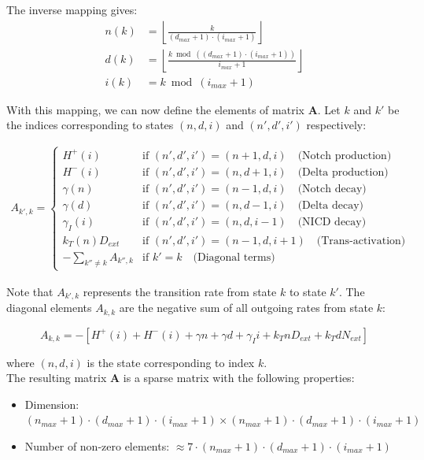 \documentclass{article}
\begin{document}
\begin{flushleft}
The inverse mapping gives:
\begin{align*}
n(k) &= \left\lfloor \frac{k}{(d_{max}+1) \cdot (i_{max}+1)} \right\rfloor \\
d(k) &= \left\lfloor \frac{k \bmod ((d_{max}+1) \cdot (i_{max}+1))}{i_{max}+1} \right\rfloor \\
i(k) &= k \bmod (i_{max}+1)
\end{align*}

With this mapping, we can now define the elements of matrix $\mathbf{A}$. Let $k$ and $k'$ be the indices corresponding to states $(n,d,i)$ and $(n',d',i')$ respectively:

\begin{align*}
A_{k',k} = 
\begin{cases}
H^+(i) & \text{if } (n',d',i') = (n+1,d,i) \quad \text{(Notch production)} \\
H^-(i) & \text{if } (n',d',i') = (n,d+1,i) \quad \text{(Delta production)} \\
\gamma(n) & \text{if } (n',d',i') = (n-1,d,i) \quad \text{(Notch decay)} \\
\gamma(d) & \text{if } (n',d',i') = (n,d-1,i) \quad \text{(Delta decay)} \\
\gamma_I(i) & \text{if } (n',d',i') = (n,d,i-1) \quad \text{(NICD decay)} \\
k_T(n)D_{ext} & \text{if } (n',d',i') = (n-1,d,i+1) \quad \text{(Trans-activation)} \\
-\sum_{k'' \neq k} A_{k'',k} & \text{if } k' = k \quad \text{(Diagonal terms)}
\end{cases}
\end{align*}

Note that $A_{k',k}$ represents the transition rate from state $k$ to state $k'$. The diagonal elements $A_{k,k}$ are the negative sum of all outgoing rates from state $k$:

\[
A_{k,k} = -[H^+(i) + H^-(i) + \gamma n + \gamma d + \gamma_I i + k_T n D_{ext} + k_T d N_{ext}]
\]

where $(n,d,i)$ is the state corresponding to index $k$.\\

The resulting matrix $\mathbf{A}$ is a sparse matrix with the following properties:
\begin{itemize}
    \item Dimension: $(n_{max}+1) \cdot (d_{max}+1) \cdot (i_{max}+1) \times (n_{max}+1) \cdot (d_{max}+1) \cdot (i_{max}+1)$
    \item Number of non-zero elements: $\approx 7 \cdot (n_{max}+1) \cdot (d_{max}+1) \cdot (i_{max}+1)$
\end{itemize}


\end{flushleft}
\end{document}
